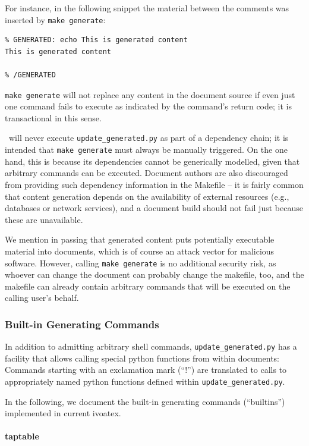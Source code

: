 \documentclass[11pt,a4paper]{ivoa}
\begin{document}
For instance, in the following snippet the material between the comments
was inserted by \texttt{make generate}:

\begin{lstlisting}
% GENERATED: echo This is generated content
This is generated content

% /GENERATED
\end{lstlisting}

\texttt{make generate} will not replace any content in the document source
if even just one command fails to execute as indicated by the
command's return code; it is transactional in this sense.

\ivoatex~will never execute \texttt{update\_generated.py} as part of a
dependency chain; it is intended that \texttt{make generate} must always
be manually triggered.  On the one hand, this is because its
dependencies cannot be generically modelled, given that arbitrary
commands can be executed.  Document authors are also discouraged from
providing such dependency information in
the Makefile -- it is fairly common that
content generation depends on the availability of external resources
(e.g., databases or network services), and a document build should not
fail just because these are unavailable.

We mention in passing that generated content puts potentially executable
material into documents, which is of course an attack vector for
malicious software.  However, calling \texttt{make generate} is no
additional security risk, as whoever can change the document can
probably change the makefile, too, and the makefile can already contain
arbitrary commands that will be executed on the calling user's behalf.


\subsubsection{Built-in Generating Commands}

In addition to admitting arbitrary shell
commands, \texttt{update\_generated.py} has a facility that allows
calling special python functions from within documents: Commands
starting with an exclamation mark (``!'') are translated to calls to
appropriately named python functions defined within
\texttt{update\_generated.py}.

In the following, we document the built-in generating commands
(``builtins'') implemented in current ivoatex.

\paragraph{taptable}
\end{document}

